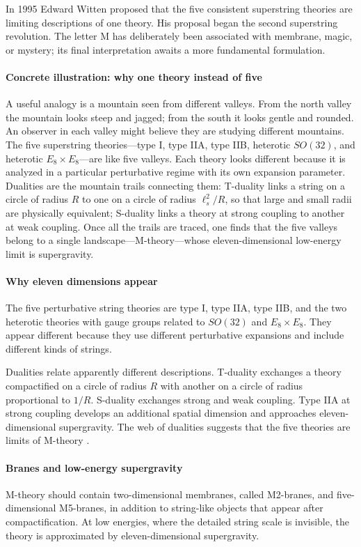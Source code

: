In 1995 Edward Witten proposed that the five consistent superstring theories are limiting descriptions of one theory. His proposal began the second superstring revolution. The letter M has deliberately been associated with membrane, magic, or mystery; its final interpretation awaits a more fundamental formulation.

\paragraph{Concrete illustration: why one theory instead of five}
A useful analogy is a mountain seen from different valleys. From the north valley the mountain looks steep and jagged; from the south it looks gentle and rounded. An observer in each valley might believe they are studying different mountains. The five superstring theories---type I, type IIA, type IIB, heterotic $SO(32)$, and heterotic $E_8\times E_8$---are like five valleys. Each theory looks different because it is analyzed in a particular perturbative regime with its own expansion parameter. Dualities are the mountain trails connecting them: T-duality links a string on a circle of radius $R$ to one on a circle of radius $\ell_s^2/R$, so that large and small radii are physically equivalent; S-duality links a theory at strong coupling to another at weak coupling. Once all the trails are traced, one finds that the five valleys belong to a single landscape---M-theory---whose eleven-dimensional low-energy limit is supergravity.

\paragraph{Why eleven dimensions appear}
The five perturbative string theories are type I, type IIA, type IIB, and the two heterotic theories with gauge groups related to $SO(32)$ and $E_8\times E_8$. They appear different because they use different perturbative expansions and include different kinds of strings.

Dualities relate apparently different descriptions. T-duality exchanges a theory compactified on a circle of radius $R$ with another on a circle of radius proportional to $1/R$. S-duality exchanges strong and weak coupling. Type IIA at strong coupling develops an additional spatial dimension and approaches eleven-dimensional supergravity. The web of dualities suggests that the five theories are limits of M-theory \cite{m_theory_ref2}.

\paragraph{Branes and low-energy supergravity}
M-theory should contain two-dimensional membranes, called M2-branes, and five-dimensional M5-branes, in addition to string-like objects that appear after compactification. At low energies, where the detailed string scale is invisible, the theory is approximated by eleven-dimensional supergravity.

